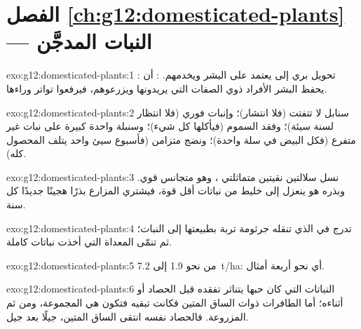 \section*{الفصل \ref{ch:g12:domesticated-plants} --- النبات المدجَّن}

\begin{solution}{exo:g12:domesticated-plants:1}
: تحويل  بري إلى  يعتمد على البشر ويخدمهم. : أن يحفظ البشر الأفراد ذوي الصفات التي يريدونها ويزرعوهم،
فيرفعوا تواتر  وراءها.
\end{solution}

\begin{solution}{exo:g12:domesticated-plants:2}
سنابل لا تتفتت (فلا انتشار)؛ وإنبات فوري (فلا انتظار لسنة سيئة)؛ وفقد
السموم (فيأكلها كل شيء)؛ وسنبلة واحدة كبيرة على نبات غير متفرع (فكل
البيض في سلة واحدة)؛ ونضج متزامن (فأسبوع سيئ واحد يتلف المحصول كله).
\end{solution}

\begin{solution}{exo:g12:domesticated-plants:3}
نسل سلالتين نقيتين متماثلتي ، وهو متجانس قوي. وبذره هو ينعزل
إلى خليط من نباتات أقل قوة، فيشتري المزارع بذرًا هجينًا جديدًا كل سنة.
\end{solution}

\begin{solution}{exo:g12:domesticated-plants:4}
تدرج  في  الذي تنقله جرثومة تربة بطبيعتها إلى  النبات؛
ثم تنمّى  المعداة التي أخذت  نباتات كاملة.
\end{solution}

\begin{solution}{exo:g12:domesticated-plants:5}
من نحو \num{1.9} إلى \qty{7.2}{t/ha}: أي نحو أربعة أمثال.
\end{solution}

\begin{solution}{exo:g12:domesticated-plants:6}
النباتات التي كان حبها يتناثر تفقده قبل الحصاد أو أثناءه؛ أما الطافرات
ذوات الساق المتين فكانت تبقيه فتكون هي المجموعة، ومن ثم المزروعة.
فالحصاد نفسه انتقى  الساق المتين، جيلًا بعد جيل.
\end{solution}

